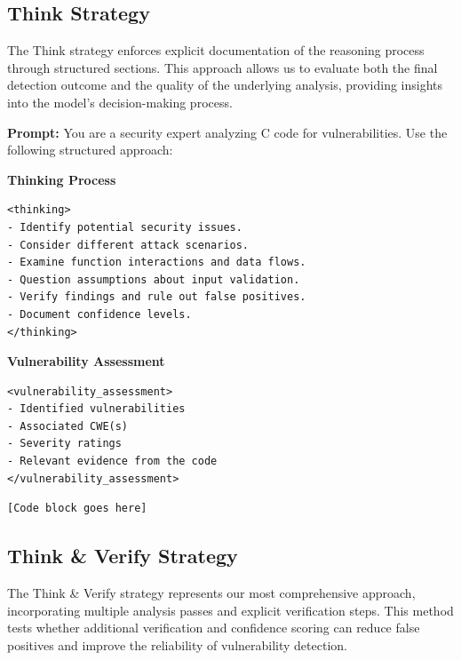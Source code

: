 \documentclass[sigconf,review,anonymous]{acmart}
\begin{document}
\subsection{Think Strategy}
The Think strategy enforces explicit documentation of the reasoning process through structured sections. This approach allows us to evaluate both the final detection outcome and the quality of the underlying analysis, providing insights into the model's decision-making process.
\begin{tcolorbox}[colback=greenbox, colframe=green!60!black, 
title=\textbf{Think Strategy (Single-shot)}, 
sharp corners=south, boxrule=1pt, width=\linewidth]
\textbf{Prompt:}  
You are a security expert analyzing C code for vulnerabilities. Use the following structured approach:

\textbf{Thinking Process}
\begin{verbatim}
<thinking>
- Identify potential security issues.
- Consider different attack scenarios.
- Examine function interactions and data flows.
- Question assumptions about input validation.
- Verify findings and rule out false positives.
- Document confidence levels.
</thinking>
\end{verbatim}

\textbf{Vulnerability Assessment}
\begin{verbatim}
<vulnerability_assessment>
- Identified vulnerabilities
- Associated CWE(s)
- Severity ratings
- Relevant evidence from the code
</vulnerability_assessment>
\end{verbatim}

\begin{verbatim}
[Code block goes here]
\end{verbatim}
\end{tcolorbox}

\subsection{Think \& Verify Strategy}
The Think \& Verify strategy represents our most comprehensive approach, incorporating multiple analysis passes and explicit verification steps. This method tests whether additional verification and confidence scoring can reduce false positives and improve the reliability of vulnerability detection.
\end{document}
